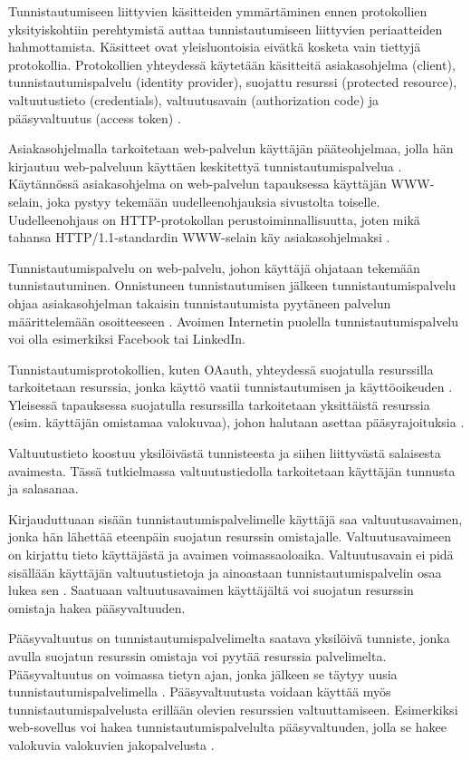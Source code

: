 Tunnistautumiseen liittyvien käsitteiden ymmärtäminen ennen protokollien yksityiskohtiin perehtymistä auttaa tunnistautumiseen liittyvien periaatteiden hahmottamista. Käsitteet ovat yleisluontoisia eivätkä kosketa vain tiettyjä protokollia. Protokollien yhteydessä käytetään käsitteitä asiakasohjelma (client), tunnistautumispalvelu (identity provider), suojattu resurssi (protected resource), valtuutustieto (credentials), valtuutusavain (authorization code) ja pääsyvaltuutus (access token) \cite{nisti}.

Asiakasohjelmalla tarkoitetaan web-palvelun käyttäjän pääteohjelmaa, jolla hän kirjautuu web-palveluun käyttäen keskitettyä tunnistautumispalvelua \cite{nisti}. Käytännössä asiakasohjelma on web-palvelun tapauksessa käyttäjän WWW-selain, joka pystyy tekemään uudelleenohjauksia sivustolta toiselle. Uudelleenohjaus on HTTP-pro\-to\-kol\-lan perustoiminnallisuutta, joten mikä tahansa HTTP/1.1-standardin WWW-selain käy asiakasohjelmaksi \cite{rfc2616}.

Tunnistautumispalvelu on web-palvelu, johon käyttäjä ohjataan tekemään tunnistautuminen. Onnistuneen tunnistautumisen jälkeen tunnistautumispalvelu ohjaa asi\-a\-kas\-oh\-jel\-man takaisin tunnistautumista pyytäneen palvelun määrittelemään osoitteeseen \cite{nisti}. Avoimen Internetin puolella tunnistautumispalvelu voi olla esimerkiksi Facebook tai LinkedIn.

Tunnistautumisprotokollien, kuten OAauth, yhteydessä suojatulla resurssilla tarkoitetaan resurssia, jonka käyttö vaatii tunnistautumisen ja käyttöoikeuden \cite{oauth2_0}. Yleisessä tapauksessa suojatulla resurssilla tarkoitetaan yksittäistä resurssia (esim. käyttäjän omistamaa valokuvaa), johon halutaan asettaa pääsyrajoituksia \cite{nisti}.

Valtuutustieto koostuu yksilöivästä tunnisteesta ja siihen liittyvästä salaisesta avaimesta. Tässä tutkielmassa valtuutustiedolla tarkoitetaan käyttäjän tunnusta ja salasanaa.

Kirjauduttuaan sisään tunnistautumispalvelimelle käyttäjä saa valtuutusavaimen, jonka hän lähettää eteenpäin suojatun resurssin omistajalle. Valtuutusavaimeen on kirjattu tieto käyttäjästä ja avaimen voimassaoloaika. Valtuutusavain ei pidä sisällään käyttäjän valtuutustietoja ja ainoastaan tunnistautumispalvelin osaa lukea sen \cite{nisti}. Saatuaan valtuutusavaimen käyttäjältä voi suojatun resurssin omistaja hakea pääsyvaltuuden.

Pääsyvaltuutus on tunnistautumispalvelimelta saatava yksilöivä tunniste, jonka avulla suojatun resurssin omistaja voi pyytää resurssia palvelimelta. Pääsyvaltuutus on voimassa tietyn ajan, jonka jälkeen se täytyy uusia tunnistautumispalvelimella \cite{nisti}. Pääsyvaltuutusta voidaan käyttää myös tunnistautumispalvelusta erillään olevien resurssien valtuuttamiseen. Esimerkiksi web-sovellus voi hakea tunnistautumispalvelulta pääsyvaltuuden, jolla se hakee valokuvia valokuvien jakopalvelusta \cite{facebook}.